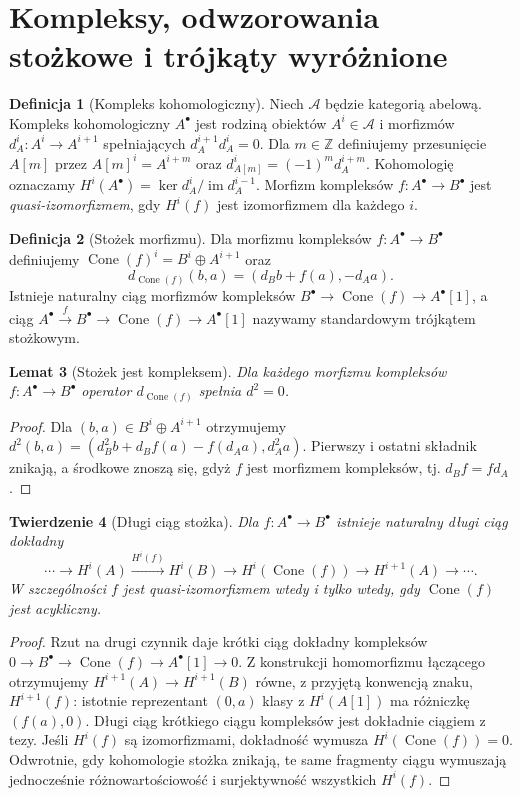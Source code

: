 \documentclass[11pt,a4paper,oneside]{report}
\newcommand{\Z}{\mathbb{Z}}
\theoremstyle{plain}
\newtheorem{twierdzenie}{Twierdzenie}[section]
\newtheorem{lemat}[twierdzenie]{Lemat}
\theoremstyle{definition}
\newtheorem{definicja}[twierdzenie]{Definicja}
\theoremstyle{remark}
\begin{document}
\section{Kompleksy, odwzorowania stożkowe i trójkąty wyróżnione}
\begin{definicja}[Kompleks kohomologiczny]
Niech $\mathcal A$ będzie kategorią abelową. Kompleks
kohomologiczny $A^\bullet$ jest rodziną obiektów
$A^i\in\mathcal A$ i morfizmów
$d_A^i:A^i\to A^{i+1}$ spełniających
$d_A^{i+1}d_A^i=0$. Dla $m\in\Z$ definiujemy
przesunięcie $A[m]$ przez
$A[m]^i=A^{i+m}$ oraz $d_{A[m]}^i=(-1)^m d_A^{i+m}$.
Kohomologię oznaczamy
$H^i(A^\bullet)=\ker d_A^i/\operatorname{im}d_A^{i-1}$.
Morfizm kompleksów $f:A^\bullet\to B^\bullet$ jest
\emph{quasi-izomorfizmem}, gdy $H^i(f)$ jest izomorfizmem
dla każdego $i$.
\end{definicja}

\begin{definicja}[Stożek morfizmu]
Dla morfizmu kompleksów $f:A^\bullet\to B^\bullet$
definiujemy $\operatorname{Cone}(f)^i=B^i\oplus A^{i+1}$ oraz
\[
d_{\operatorname{Cone}(f)}(b,a)=(d_Bb+f(a),-d_Aa).
\]
Istnieje naturalny ciąg morfizmów kompleksów
$B^\bullet\to\operatorname{Cone}(f)\to A^\bullet[1]$,
a ciąg $A^\bullet\xrightarrow f B^\bullet\to
\operatorname{Cone}(f)\to A^\bullet[1]$
nazywamy standardowym trójkątem stożkowym.
\end{definicja}
\begin{lemat}[Stożek jest kompleksem]
\label{lem:cone-complex-xiv}
Dla każdego morfizmu kompleksów $f:A^\bullet\to B^\bullet$
operator $d_{\operatorname{Cone}(f)}$ spełnia $d^2=0$.
\end{lemat}
\begin{proof}
Dla $(b,a)\in B^i\oplus A^{i+1}$ otrzymujemy
$d^2(b,a)=(d_B^2b+d_Bf(a)-f(d_Aa),d_A^2a)$.
Pierwszy i ostatni składnik znikają, a środkowe znoszą się,
gdyż $f$ jest morfizmem kompleksów, tj. $d_Bf=fd_A$.
\end{proof}

\begin{twierdzenie}[Długi ciąg stożka]
\label{thm:cone-les-xiv}
Dla $f:A^\bullet\to B^\bullet$ istnieje naturalny długi
ciąg dokładny
\[
\cdots\to H^i(A)\xrightarrow{H^i(f)}H^i(B)
\to H^i(\operatorname{Cone}(f))\to H^{i+1}(A)\to\cdots.
\]
W szczególności $f$ jest quasi-izomorfizmem wtedy i tylko wtedy,
gdy $\operatorname{Cone}(f)$ jest acykliczny.
\end{twierdzenie}
\begin{proof}
Rzut na drugi czynnik daje krótki ciąg dokładny kompleksów
$0\to B^\bullet\to\operatorname{Cone}(f)\to A^\bullet[1]\to0$.
Z konstrukcji homomorfizmu łączącego otrzymujemy
$H^{i+1}(A)\to H^{i+1}(B)$ równe, z przyjętą konwencją
znaku, $H^{i+1}(f)$: istotnie reprezentant $(0,a)$
klasy z $H^i(A[1])$ ma różniczkę $(f(a),0)$.
Długi ciąg krótkiego ciągu kompleksów jest dokładnie
ciągiem z tezy. Jeśli $H^i(f)$ są izomorfizmami,
dokładność wymusza $H^i(\operatorname{Cone}(f))=0$.
Odwrotnie, gdy kohomologie stożka znikają, te same
fragmenty ciągu wymuszają jednocześnie różnowartościowość
i surjektywność wszystkich $H^i(f)$.
\end{proof}
\end{document}
